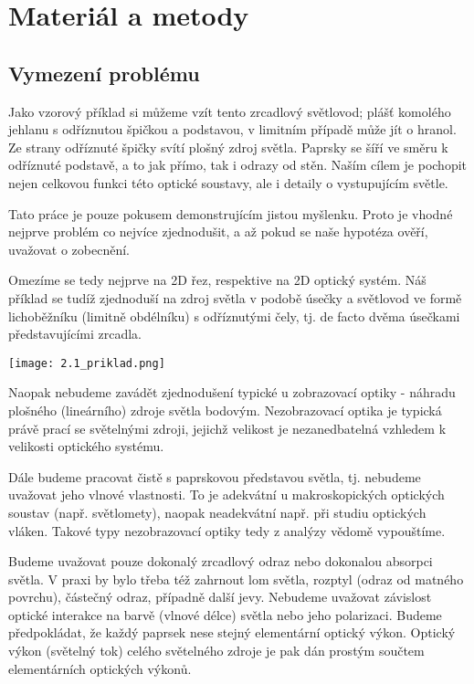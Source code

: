 \chapter{Materiál a metody}

\section{Vymezení problému}


Jako vzorový příklad si můžeme vzít tento zrcadlový světlovod; plášť komolého jehlanu s odříznutou špičkou a podstavou, v limitním případě může jít o hranol. Ze strany odříznuté špičky svítí plošný zdroj světla. Paprsky se šíří ve směru k odříznuté podstavě, a to jak přímo, tak i odrazy od stěn. Naším cílem je pochopit nejen celkovou funkci této optické soustavy, ale i detaily o vystupujícím světle.

Tato práce je pouze pokusem demonstrujícím jistou myšlenku. Proto je vhodné nejprve problém co nejvíce zjednodušit, a až pokud se naše hypotéza ověří, uvažovat o zobecnění.

Omezíme se tedy nejprve na 2D řez, respektive na 2D optický systém. Náš příklad se tudíž zjednoduší na zdroj světla v podobě úsečky a světlovod ve formě lichoběžníku (limitně obdélníku) s odříznutými čely, tj. de facto dvěma úsečkami představujícími zrcadla.

\begin{center}
    \texttt{[image: 2.1\_priklad.png]}\\
\end{center}

Naopak nebudeme zavádět zjednodušení typické u zobrazovací optiky - náhradu plošného (lineárního) zdroje světla bodovým. Nezobrazovací optika je typická právě prací se světelnými zdroji, jejichž velikost je nezanedbatelná vzhledem k velikosti optického systému.

Dále budeme pracovat čistě s paprskovou představou světla, tj. nebudeme uvažovat jeho vlnové vlastnosti. To je adekvátní u makroskopických optických soustav (např. světlomety), naopak neadekvátní např. při studiu optických vláken. Takové typy nezobrazovací optiky tedy z analýzy vědomě
vypouštíme.

Budeme uvažovat pouze dokonalý zrcadlový odraz nebo dokonalou absorpci světla. V praxi by bylo třeba též zahrnout lom světla, rozptyl (odraz od matného povrchu), částečný odraz, případně další jevy. Nebudeme uvažovat závislost optické interakce na barvě (vlnové délce) světla nebo jeho polarizaci. Budeme předpokládat, že každý paprsek nese stejný elementární optický výkon. Optický výkon (světelný tok) celého světelného zdroje je pak dán prostým součtem elementárních optických výkonů.

